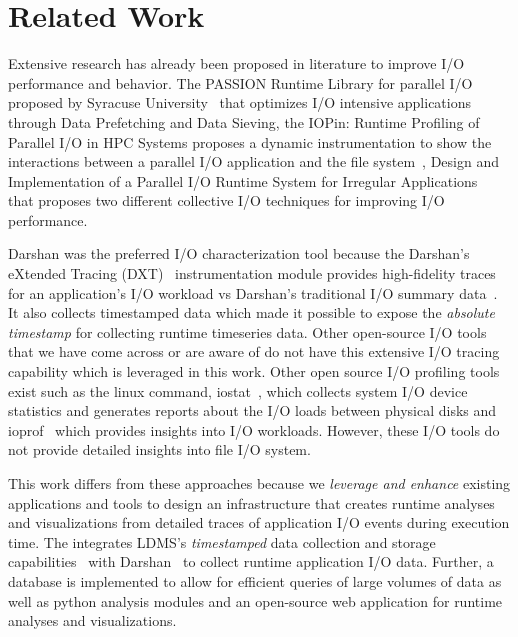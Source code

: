 \section{Related Work}
\label{sec:rw}
Extensive research has already been proposed in literature to improve I/O performance and behavior. The PASSION Runtime Library for parallel I/O proposed by Syracuse University~\cite{RuntimeLibrary-ParallelI/O} that optimizes I/O intensive applications through Data Prefetching and Data Sieving, the IOPin: Runtime Profiling of Parallel I/O in HPC
Systems proposes a dynamic instrumentation to show the interactions between a parallel I/O application and the file system~\cite{HPC-IO-Runtime}, Design and Implementation of a Parallel I/O Runtime System for Irregular Applications~\cite{RuntimeLibrary-IrregularApps} that proposes two different collective I/O techniques for improving I/O performance. 

Darshan was the preferred I/O characterization tool because the Darshan's eXtended Tracing (DXT)~\cite{darshan-runtime} instrumentation module provides high-fidelity traces for an application's I/O workload vs Darshan's traditional I/O summary data~\cite{darshan-runtime}. It also collects timestamped data which made it possible to expose the \emph{absolute timestamp} for collecting runtime timeseries data. Other open-source I/O tools that we have come across or are aware of do not have this extensive I/O tracing capability which is leveraged in this work. Other open source I/O profiling tools exist such as the linux command, iostat~\cite{iostat}, which collects system I/O device statistics and generates reports about the I/O loads between physical disks and ioprof~\cite{ioprof} which provides insights into I/O workloads. However, these I/O tools do not provide detailed insights into file I/O system.

This work differs from these approaches because we \emph{leverage and enhance} existing applications and tools to design an infrastructure that creates runtime analyses and visualizations from detailed traces of application I/O events during execution time. The \Darshan{} integrates LDMS's \emph{timestamped} data collection and storage capabilities~\cite{ldmsgithub} with Darshan~\cite{darshan-webpage} to collect runtime application I/O data. Further, a database is implemented to allow for efficient queries of large volumes of data as well as python analysis modules and an open-source web application for runtime analyses and visualizations.

